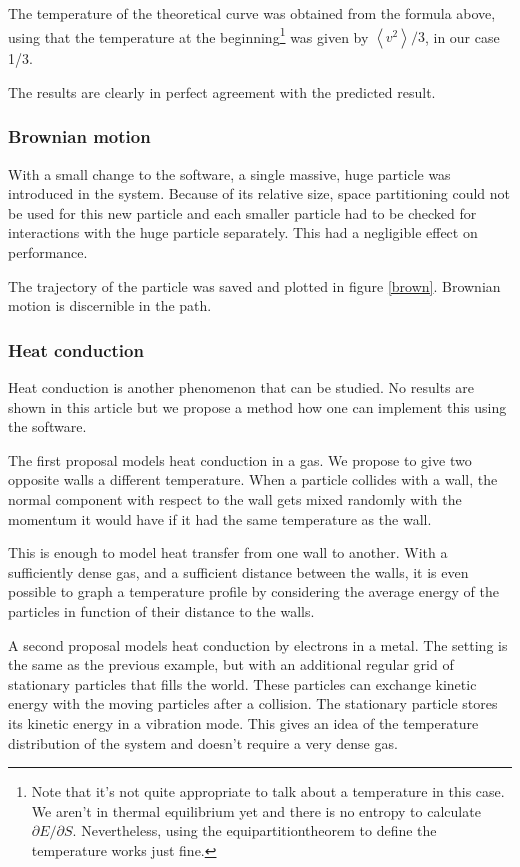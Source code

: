 The temperature of the theoretical curve was obtained from the formula 
above, using that the temperature at the beginning\footnote{Note that it's 
not quite appropriate to talk about a temperature in this case. We aren't 
in thermal equilibrium yet and there is no entropy to calculate $\partial E 
/ \partial S$. Nevertheless, using the equipartitiontheorem to define the 
temperature works just fine.}
was given by $\left<v^2\right>/3$, in our case 1/3.

The results are clearly in perfect agreement with the predicted result.

\subsubsection{Brownian motion}
With a small change to the software, a single massive, huge particle was 
introduced in the system. Because of its relative size, space partitioning 
could not be used for this new particle and each smaller particle had to be 
checked for interactions with the huge particle separately. This had a 
negligible effect on performance.


The trajectory of the particle was saved and plotted in figure \ref{brown}.  
Brownian motion is discernible in the path.

\subsubsection{Heat conduction}

Heat conduction is another phenomenon that can be studied. No results are shown 
in this article but we propose a method how one can implement this using the 
software.

The first proposal models heat conduction in a gas. We propose to give two 
opposite walls a different temperature. When a particle collides with a 
wall, the normal component with respect to the wall gets mixed randomly 
with the momentum it would have if it had the same temperature as the wall.  

This is enough to model heat transfer from one wall to another. With a 
sufficiently dense gas, and a sufficient distance between the walls, it is 
even possible to graph a temperature profile by considering the average 
energy of the particles in function of their distance to the walls.

A second proposal models heat conduction by electrons in a metal. The 
setting is the same as the previous example, but with an additional regular 
grid of stationary particles that fills the world. These particles can 
exchange kinetic energy with the moving particles after a collision. The 
stationary particle stores its kinetic energy in a vibration mode. This 
gives an idea of the temperature distribution of the system and doesn't 
require a very dense gas.
